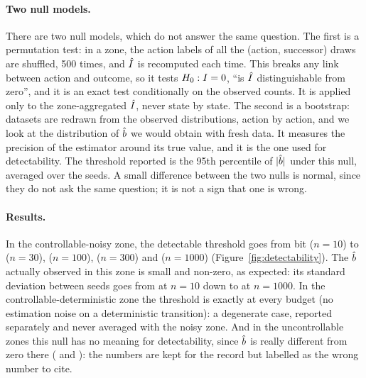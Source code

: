 \documentclass[10pt]{article}
\begin{document}
\paragraph{Two null models.}
There are two null models, which do not answer the same question.
The first is a permutation test: in a zone, the action labels of all the (action, successor) draws are shuffled, 500 %
times, and $\hat{I}$ is recomputed each time. This breaks any link between action and outcome, so it tests
$H_{0}{}: I = 0$, ``is $\hat{I}$ distinguishable from zero'', and it is an exact test conditionally on the observed %
counts. It is applied only to the zone-aggregated $\hat{I}$, never state by state.
The second is a bootstrap: datasets are redrawn from the observed distributions, action by action, and we look at the
distribution of $\hat{b}$ we would obtain with fresh data. It measures the precision of the estimator around its true value,
and it is the one used for detectability.
The threshold reported is the 95th percentile of $|\hat{b}|$ under this null, averaged over the seeds. %
A small difference between the two nulls is normal, since they do not ask the same question; it is not a sign that one is
wrong.

\paragraph{Results.}
In the controllable-noisy zone, the detectable threshold goes from \eOneThresholdTen{} bit ($n = 10$) to %
\eOneThresholdThirty{} ($n = 30$), \eOneThresholdHundred{} ($n = 100$), \eOneThresholdThreeHundred{} ($n = 300$) and %
\eOneThresholdThousand{} ($n = 1000$) (Figure~\ref{fig:detectability}). %
The $\hat{b}$ actually observed in this zone is small and non-zero, as expected: its standard deviation between seeds goes
from \eOneBSdCNTen{} at $n = 10$ down to \eOneBSdCNThousand{} at $n = 1000$. %
In the controllable-deterministic zone the threshold is exactly \eOneThresholdCD{} at every budget (no estimation noise on
a deterministic transition): a degenerate case, reported separately and never averaged with the noisy zone.
And in the uncontrollable zones this null has no meaning for detectability, since $\hat{b}$ is really different from zero
there (\eOnePredBUD{} and \eOnePredBUNShort): the numbers are kept for the record but labelled as the wrong number to cite.
\end{document}
